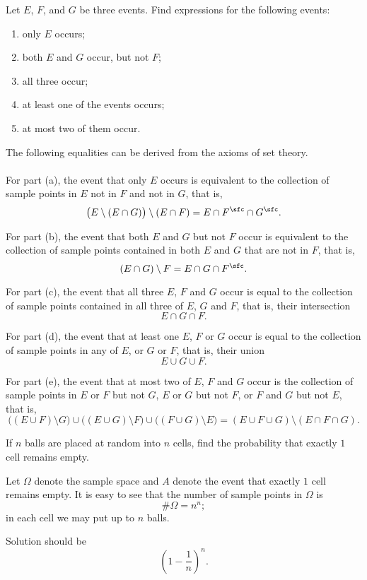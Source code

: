 \begin{problem}[DasGupta, 1.7]
  Let \(E\), \(F\), and \(G\) be three events. Find expressions for the
  following events:
  \begin{enumerate}[label=(\alph*),noitemsep]
  \item only \(E\) occurs;
  \item both \(E\) and \(G\) occur, but not \(F\);
  \item all three occur;
  \item at least one of the events occurs;
  \item at most two of them occur.
  \end{enumerate}
\end{problem}
\begin{solution}
  The following equalities can be derived from the axioms of set theory.
  \\\\
  For part (a), the event that only \(E\) occurs is equivalent to the
  collection of sample points in \(E\) not in \(F\) and not in \(G\), that
  is,
  \[
    \bigl(E\setminus(E\cap G)\bigr)\setminus(E\cap F)
    =E\cap F^\sfc\cap G^\sfc.
  \]

  For part (b), the event that both \(E\) and \(G\) but not \(F\) occur is
  equivalent to the collection of sample points contained in both \(E\) and
  \(G\) that are not in \(F\), that is,
  \[
    (E\cap G)\setminus F=E\cap G\cap F^\sfc.
  \]

  For part (c), the event that all three \(E\), \(F\) and \(G\) occur is
  equal to the collection of sample points contained in all three of \(E\),
  \(G\) and \(F\), that is, their intersection
  \[
    E\cap G\cap F.
  \]

  For part (d), the event that at least one \(E\), \(F\) or \(G\) occur is
  equal to the collection of sample points in any of \(E\), or \(G\) or
  \(F\), that is, their union
  \[
    E\cup G\cup F.
  \]

  For part (e), the event that at most two of \(E\), \(F\) and \(G\) occur
  is the collection of sample points in \(E\) or \(F\) but not \(G\), \(E\)
  or \(G\) but not \(F\), or \(F\) and \(G\) but not \(E\), that is,
  \[
   \bigl((E\cup F)\setminus G\bigr)\cup
   \bigl((E\cup G)\setminus F\bigr)\cup
   \bigl((F\cup G)\setminus E\bigr)=(E\cup F\cup G)\setminus(E\cap F\cap G).
  \]
\end{solution}
\newpage

\begin{problem}
  If \(n\) balls are placed at random into \(n\) cells, find the
  probability that exactly \(1\) cell remains empty.
\end{problem}
\begin{solution}
  Let \(\Omega\) denote the sample space and \(A\) denote the event that
  exactly \(1\) cell remains empty. It is easy to see that the number of
  sample points in \(\Omega\) is
  \[
    \#\Omega=n^n;
  \]
  \ie{} in each cell we may put up to \(n\) balls.

  Solution should be
  \[
    \left(1-\frac{1}{n}\right)^n.
  \]
\end{solution}
\newpage

